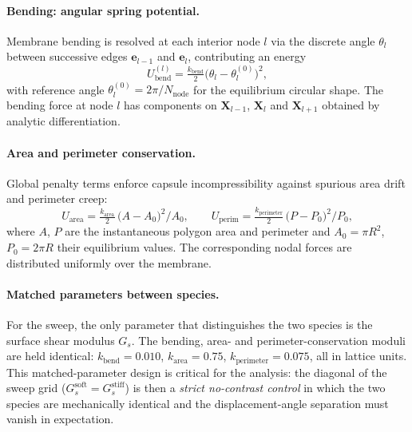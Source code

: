 \documentclass[11pt,a4paper]{article}
\begin{document}
\paragraph{Bending: angular spring potential.}
Membrane bending is resolved at each interior node $l$ via the
discrete angle $\theta_l$ between successive edges
$\boldsymbol e_{l-1}$ and $\boldsymbol e_l$, contributing an
energy~\citep{kruger2011efficient}
\begin{equation}
U_{\text{bend}}^{(l)} = \tfrac{k_{\text{bend}}}{2}
   \bigl( \theta_l - \theta_l^{(0)} \bigr)^2,
\label{eq:bending}
\end{equation}
with reference angle $\theta_l^{(0)} = 2\pi/N_{\text{node}}$ for the
equilibrium circular shape. The bending force at node $l$ has
components on $\boldsymbol X_{l-1}$, $\boldsymbol X_l$ and
$\boldsymbol X_{l+1}$ obtained by analytic differentiation.

\paragraph{Area and perimeter conservation.}
Global penalty terms enforce capsule incompressibility against
spurious area drift and perimeter creep:
\begin{equation}
U_{\text{area}} = \tfrac{k_{\text{area}}}{2}\,
   \bigl(A - A_0\bigr)^2 / A_0,
\qquad
U_{\text{perim}} = \tfrac{k_{\text{perimeter}}}{2}\,
   \bigl(P - P_0\bigr)^2 / P_0,
\label{eq:area-perim}
\end{equation}
where $A$, $P$ are the instantaneous polygon area and perimeter and
$A_0 = \pi R^2$, $P_0 = 2\pi R$ their equilibrium values. The
corresponding nodal forces are distributed uniformly over the
membrane.

\paragraph{Matched parameters between species.}
For the sweep, the only parameter that distinguishes the two
species is the surface shear modulus $G_s$. The bending, area- and
perimeter-conservation moduli are held identical:
$k_{\text{bend}} = 0.010$,
$k_{\text{area}} = 0.75$,
$k_{\text{perimeter}} = 0.075$, all in lattice units. This
matched-parameter design is critical for the analysis: the diagonal
of the sweep grid ($G_s^{\text{soft}} = G_s^{\text{stiff}}$) is then
a \emph{strict no-contrast control} in which the two species are
mechanically identical and the displacement-angle separation must
vanish in expectation.
\end{document}
